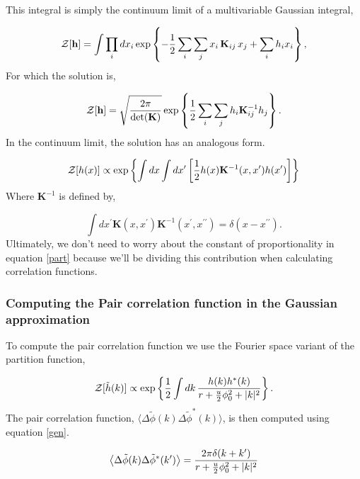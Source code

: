 This integral is simply the continuum limit of a multivariable Gaussian integral,

\begin{equation}
\mathcal{Z}[\mathbf{h}] = \int \prod_i dx_i \exp \left\lbrace - \frac{1}{2}\sum_i \sum_j x_i\, \mathbf{K}_{ij}\, x_j  + \sum_i h_i x_i\right\rbrace,
\end{equation}
For which the solution is,

\begin{equation}
\mathcal{Z}[\mathbf{h}] = \sqrt{\frac{2\pi}{\det(\mathbf{K})}} \exp\left\lbrace \frac{1}{2} \sum_i \sum_j h_i \mathbf{K}_{ij}^{-1} h_j\right\rbrace.
\end{equation}
In the continuum limit, the solution has an analogous form.

\begin{equation}\label{part}
\mathcal{Z}[h(x)] \propto \exp\left\lbrace \int dx \int dx^\prime \left[ \frac{1}{2}h(x) \mathbf{K}^{-1}(x, x^\prime) h(x^\prime)\right] \right\rbrace
\end{equation}
Where $\mathbf{K}^{-1}$ is defined by,

\begin{equation}
\int dx^\prime \mathbf{K}(x, x^\prime)\mathbf{K}^{-1}(x^\prime, x^{\prime\prime}) = \delta(x - x^{\prime\prime}).
\end{equation}
Ultimately, we don't need to worry about the constant of proportionality in equation \ref{part} because we'll be dividing this contribution when calculating correlation functions.

\subsubsection{Computing the Pair correlation function in the Gaussian approximation}

To compute the pair correlation function we use the Fourier space variant of the partition function,

\begin{equation}
\mathcal{Z}[\tilde{h}(k)] \propto \exp\left\lbrace \frac{1}{2}\int dk\,\frac{h(k)h^{*}(k)}{r + \frac{u}{2}\phi_0^2 +  \vert k \vert^2}\right\rbrace.
\end{equation}
The pair correlation function, $\langle \Delta\tilde{\phi}(k)\Delta\tilde{\phi}^{*}(k)\rangle$, is then computed using equation \ref{gen}.

\begin{equation}
\left\langle \Delta\tilde{\phi}(k)\Delta\tilde{\phi}^{*}(k^\prime) \right\rangle = \frac{2\pi \delta(k+k^\prime)}{r + \frac{u}{2}\phi_0^2 + \vert k \vert^2}
\end{equation}

